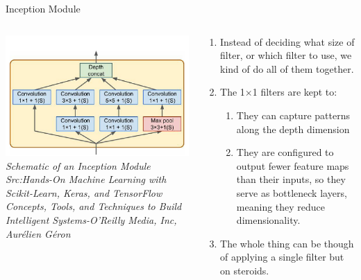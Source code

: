 \begin{frame}{Inception Module}
	\begin{columns}[T]
        \begin{column}{0.4\textwidth}
        	\includegraphics[width=\textwidth]{images/Inception module without bottlenecks.png}
			\tiny{\textit{Schematic of an Inception Module\\ Src:Hands-On Machine Learning with Scikit-Learn, Keras, and TensorFlow  Concepts, Tools, and Techniques to Build Intelligent Systems-O'Reilly Media, Inc, Aurélien Géron }}
        \end{column}
		\begin{column}{0.6\textwidth}
			\begin{enumerate}[$\bullet$]
				\item Instead of deciding what size of filter, or which filter to use, we kind of do all of them together.\pause
				\item The 1$\times$1 filters are kept to:
					\begin{enumerate}[$\bullet$]
						\item They can capture patterns
						along the depth dimension\pause
						\item They are configured to output fewer feature maps than their inputs, so
						they serve as bottleneck layers, meaning they reduce dimensionality.\pause
					\end{enumerate}
				\item The whole thing can be though of applying a single filter but on steroids.
			\end{enumerate}
		\end{column} 
    \end{columns}
\end{frame}
